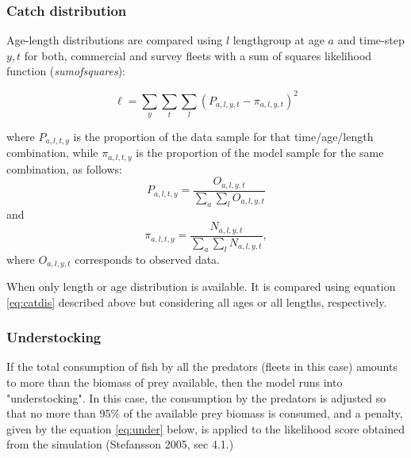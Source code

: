 \documentclass[review]{elsarticle}
\begin{document}
\subsubsection*{Catch distribution}

Age-length distributions are compared using $l$ lengthgroup at age $a$ and time-step $y,t$ for both, commercial and survey fleets with a sum of squares likelihood function (\textit{sumofsquares}):

\begin{equation}
\label{eq:catdis}
\ell= \sum\limits_y \sum\limits_t \sum\limits_l (P_{a,l,y,t} - \pi_{a,l,y,t})^2
\end{equation}

where $P_{a,l,t,y}$ is the proportion of the data sample for that time/age/length combination, while $\pi_{a,l,t,y}$ is the proportion of the model sample for the same combination, as follows:
\begin{equation}
P_{a,l,t,y}=\frac{O_{a,l,y,t}}{\sum\limits_a \sum\limits_l  O_{a,l,y,t} }
\end{equation}
and
\begin{equation}
\pi_{a,l,t,y}=\frac{ N_{a,l,y,t}}{\sum\limits_a \sum\limits_l  N_{a,l,y,t} },
\end{equation}
where  $O_{a,l,y,t}$ corresponds to observed data. 


When only length or age distribution is available. It is compared using equation \ref{eq:catdis} described above but considering all ages or all lengths, respectively.


% 
% 
% 

\subsubsection*{Understocking}
If the total consumption of fish by all the predators (fleets in this case) amounts to more than the biomass of prey available, then the model runs into "understocking". In this case, the consumption by the predators is adjusted so that no more than 95\% of the available prey biomass is consumed, and a penalty, given by the equation \ref{eq:under}  below, is applied to the likelihood score obtained from the simulation (Stefansson 2005, sec 4.1.)
\end{document}
